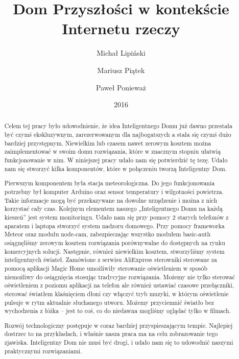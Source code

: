 \documentclass[brudnopis]{xmgr}
\author   {Michał Lipiński}
\author   {Mariusz Piątek}
\author   {Paweł Ponieważ}
\title    {Dom Przyszłości w kontekście Internetu rzeczy}
\date     {2016}
\begin{document}
\begin{abstract}
  Celem tej pracy było udowodnienie, że idea Inteligentnego Domu już dawno przestała być czymś ekskluzywnym, zarezerwowanym dla najbogatszych a stała się czymś dużo bardziej przystępnym. Niewielkim lub czasem nawet zerowym kosztem można zaimplementować w swoim domu rozwiązania, które w znacznym stopniu ułatwią funkcjonowanie w nim. W niniejszej pracy udało nam się potwierdzić tę tezę. Udało nam się stworzyć kilka komponentów, które w połączeniu tworzą Inteligentny Dom.

Pierwszym komponentem była stacja meteorologiczna. Do jego funkcjonowania potrzebny był komputer Arduino oraz sensor temperatury i wilgotności powietrza. Takie informacje mogą być przekazywane na dowolne urządzenie i można z nich korzystać cały czas. Kolejnym elementem naszego „Inteligentnego Domu na każdą kieszeń” jest system monitoringu. Udało nam się przy pomocy 2 starych telefonów z aparatem i laptopa stworzyć system nadzoru domowego. Przy pomocy frameworka Meteor oraz modułu node-cam, zabezpieczając wszystko modułem basic-auth osiągnęliśmy zerowym kosztem rozwiązania porównywalne do dostępnych na rynku komercyjnych solucji. Następnie, również niewielkim kosztem, stworzyliśmy system inteligentnych świateł. Zamówione z serwisu AliExpress sterowniki sterowane za pomocą aplikacji Magic Home umożliwiły sterowanie oświetleniem w sposób niemożliwy do osiągnięcia stosując tradycyjne rozwiązania. Możemy nie tylko sterować oświetleniem z poziomu aplikacji na telefon ale również ustawiać czasowe przełączniki, sterować światłem klaśnięciem dłoni czy włączyć tryb muzyki, w którym oświetlenie pulsuje w rytm aktualnie słuchanego utworu. Możemy przyciemnić światło bez wychodzenia z łóżka – jest to coś, co do niedawna mogliśmy oglądać tylko w filmach.

Rozwój technologiczny postępuje w coraz bardziej przyspieszającym tempie. Najlepiej dostrzec to na przykładach, i właśnie nasza praca ma na celu zobrazowanie tego zjawiska. Inteligentny Dom nie musi być drogi, i udało nam się to udowodnić naszymi praktycznymi rozwiązaniami.
\end{abstract}

\end{document}
